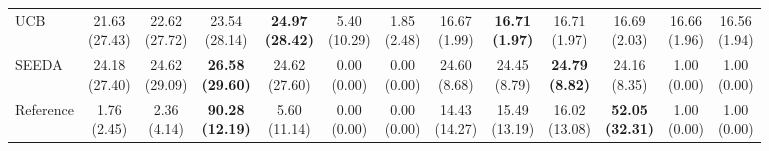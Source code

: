 {\begin{tabular}{l|cccccc|cccccc}
UCB & {\cellcolor[HTML]{C8E6C9}} \makecell{21.63 \\ (27.43)} & \makecell{22.62 \\ (27.72)} & \makecell{23.54 \\ (28.14)} & \bfseries \makecell{24.97 \\ (28.42)} & \makecell{5.40 \\ (10.29)} & \makecell{1.85 \\ (2.48)} & {\cellcolor[HTML]{C8E6C9}} \makecell{16.67 \\ (1.99)} & \bfseries \makecell{16.71 \\ (1.97)} & \makecell{16.71 \\ (1.97)} & \makecell{16.69 \\ (2.03)} & \makecell{16.66 \\ (1.96)} & \makecell{16.56 \\ (1.94)} \\
SEEDA & {\cellcolor[HTML]{C8E6C9}} \makecell{24.18 \\ (27.40)} & \makecell{24.62 \\ (29.09)} & \bfseries \makecell{26.58 \\ (29.60)} & \makecell{24.62 \\ (27.60)} & \makecell{0.00 \\ (0.00)} & \makecell{0.00 \\ (0.00)} & {\cellcolor[HTML]{C8E6C9}} \makecell{24.60 \\ (8.68)} & \makecell{24.45 \\ (8.79)} & \bfseries \makecell{24.79 \\ (8.82)} & \makecell{24.16 \\ (8.35)} & \makecell{1.00 \\ (0.00)} & \makecell{1.00 \\ (0.00)} \\
Reference & {\cellcolor[HTML]{C8E6C9}} \makecell{1.76 \\ (2.45)} & \makecell{2.36 \\ (4.14)} & \bfseries \makecell{90.28 \\ (12.19)} & \makecell{5.60 \\ (11.14)} & \makecell{0.00 \\ (0.00)} & \makecell{0.00 \\ (0.00)} & {\cellcolor[HTML]{C8E6C9}} \makecell{14.43 \\ (14.27)} & \makecell{15.49 \\ (13.19)} & \makecell{16.02 \\ (13.08)} & \bfseries \makecell{52.05 \\ (32.31)} & \makecell{1.00 \\ (0.00)} & \makecell{1.00 \\ (0.00)} \\

\end{tabular}}
